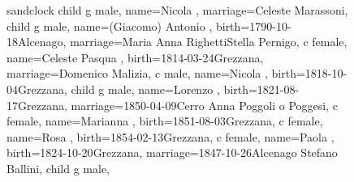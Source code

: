 \documentclass{article}
\begin{document}
\begin{figure}
\begin{minipage}[b]{0.39\textwidth}
    \begin{genealogypicture}[
        processing=database,
        database format=full,
        node size=3.5cm,
        level size=2.8cm,
        level distance=6mm,
        list separators hang=3mm,
        name font=\bfseries,
        surn code={\textcolor{black!50!black}{#1}},
        place text={\newline}{},
        date format=d month yyyy,
        tcbset={male/.style={colframe=blue,colback=blue!5},
        female/.style={colframe=red,colback=red!5}},
        box={fit basedim=7pt,boxsep=2pt,segmentation style=solid,
            halign=left,before upper=\parskip1pt,
            \gtrDBsex,
        },
    ]
    sandclock
    {
        child{
            g{
                male,
                name={Nicola },
                marriage={Celeste Marassoni}{},
            }
            child{
                g{
                    male,
                    name={(Giacomo) Antonio },
                    birth={1790-10-18}{Alcenago},
                    marriage={Maria Anna Righetti}{Stella Pernigo},
                }
                c{
                    female,
                    name={Celeste Pasqua },
                    birth={1814-03-24}{Grezzana},
                    marriage={Domenico Malizia}{},
                }
                c{
                    male,
                    name={Nicola },
                    birth={1818-10-04}{Grezzana},
                }
                child{
                    g{
                        male,
                        name={Lorenzo },
                        birth={1821-08-17}{Grezzana},
                        marriage={1850-04-09}{Cerro \newline Anna Poggoli o Poggesi},
                    }
                    c{
                        female,
                        name={Marianna },
                        birth={1851-08-03}{Grezzana},
                    }
                    c{
                        female,
                        name={Rosa },
                        birth={1854-02-13}{Grezzana},
                    }
                }
                c{
                    female,
                    name={Paola },
                    birth={1824-10-20}{Grezzana},
                    marriage={1847-10-26}{Alcenago \newline Stefano Ballini},
                }
                child{
                    g{
                        male,
}}}}}
\end{genealogypicture}
\end{minipage}
\end{figure}
\end{document}
